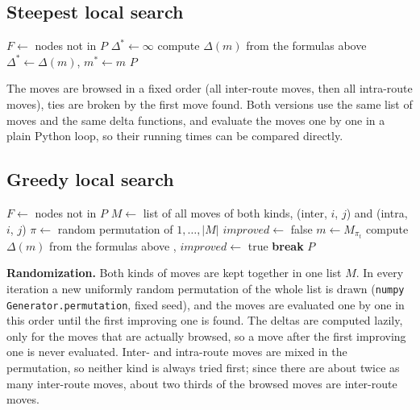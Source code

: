 \documentclass[11pt,a4paper]{article}
\begin{document}
\subsection*{Steepest local search}
\begin{algorithm}[H]
\caption{Steepest local search}
\begin{algorithmic}[1]
  \State $F \gets$ nodes not in $P$
  \Loop
    \State $\Delta^* \gets \infty$
      \State compute $\Delta(m)$ from the formulas above
        \State $\Delta^* \gets \Delta(m)$, $m^* \gets m$
      \EndIf
    \EndFor
     
      \State \Return $P$
    \EndIf
    \State {}
  \EndLoop
\EndFunction
\end{algorithmic}
\end{algorithm}
The moves are browsed in a fixed order (all inter-route moves, then all intra-route moves), ties
are broken by the first move found. Both versions use the same list of moves and the same delta
functions, and evaluate the moves one by one in a plain Python loop, so their running times can be
compared directly.

\subsection*{Greedy local search}
\begin{algorithm}[H]
\caption{Greedy local search}
\begin{algorithmic}[1]
  \State $F \gets$ nodes not in $P$
  \State $M \gets$ list of all moves of both kinds, (inter, $i$, $j$) and (intra, $i$, $j$)
  \Loop
    \State $\pi \gets$ random permutation of $1, \dots, |M|$
    \State $\mathit{improved} \gets$ false
      \State $m \gets M_{\pi_t}$
      \State compute $\Delta(m)$ from the formulas above
       
        \State {}, $\mathit{improved} \gets$ true
        \State \textbf{break}
      \EndIf
    \EndFor
     
      \State \Return $P$
    \EndIf
  \EndLoop
\EndFunction
\end{algorithmic}
\end{algorithm}

\textbf{Randomization.} Both kinds of moves are kept together in one list $M$. In every iteration
a new uniformly random permutation of the whole list is drawn (\texttt{numpy} \texttt{Generator.permutation},
fixed seed), and the moves are evaluated one by one in this order until the first improving one is
found. The deltas are computed lazily, only for the moves that are actually browsed, so a move after
the first improving one is never evaluated. Inter- and intra-route moves are mixed in the
permutation, so neither kind is always tried first; since there are about twice as many inter-route
moves, about two thirds of the browsed moves are inter-route moves.
\end{document}
